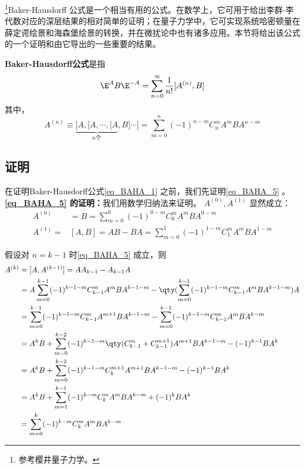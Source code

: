 \begin{issues}
\end{issues}


\footnote{参考樱井量子力学\cite{Sakurai}。}Baker-Hausdorff 公式是一个相当有用的公式。在数学上，它可用于给出李群-李代数对应的深层结果的相对简单的证明；在量子力学中，它可实现系统哈密顿量在薛定谔绘景和海森堡绘景的转换，并在微扰论中也有诸多应用。本节将给出该公式的一个证明和由它导出的一些重要的结果。

\textbf{Baker-Hausdorff公式}是指
\begin{equation}\label{eq_BAHA_1}
\E ^{A}B\E^{-A}=\sum_{n=0}^{\infty}\frac{1}{n!}[A^{(n)},B]
\end{equation}
其中，
\begin{equation}\label{eq_BAHA_5}
A^{(n)}\equiv\underbrace{[A,[A,\cdots,[A}_{n\text{个}},B]\cdots]
=\sum_{m=0}^{n}(-1)^{n-m}C_{n}^{m}A^mBA^{n-m}
\end{equation}

\subsection{证明}
在证明Baker-Hausdorff公式\autoref{eq_BAHA_1} 之前，我们先证明\autoref{eq_BAHA_5} 。\\

\textbf{\autoref{eq_BAHA_5} 的证明：}我们用数学归纳法来证明。
$A^{(0)},A^{(1)}$ 显然成立：
\begin{equation}
\begin{aligned}
A^{(0)}&=B=\sum_{m=0}^{0}(-1)^{0-m}C_{0}^{m}A^mBA^{0-m}\\
A^{(1)}=&[A,B]=AB-BA=\sum_{m=0}^{1}(-1)^{1-m}C_{1}^{m}A^mBA^{1-m}
\end{aligned}
\end{equation}

假设对 $n=k-1$ 时\autoref{eq_BAHA_5} 成立，则
\begin{equation}
\begin{aligned}
A^{(k)}&=[A,A^{(k-1)}]=AA_{k-1}-A_{k-1}A\\
&=A\sum_{m=0}^{k-1}(-1)^{k-1-m}C_{k-1}^{m}A^mBA^{k-1-m}-\qty(\sum_{m=0}^{k-1}(-1)^{k-1-m}C_{k-1}^{m}A^mBA^{k-1-m})A\\
&=\sum_{m=0}^{k-1}(-1)^{k-1-m}C_{k-1}^{m}A^{m+1}BA^{k-1-m}-\sum_{m=0}^{k-1}(-1)^{k-1-m}C_{k-1}^{m}A^mBA^{k-m}\\
&=A^{k}B+\sum_{m=0}^{k-2}(-1)^{k-1-m}\qty(C_{k-1}^{m}+C_{k-1}^{m+1})A^{m+1}BA^{k-1-m}-(-1)^{k-1}BA^k\\
&=A^{k}B+\sum_{m=0}^{k-2}(-1)^{k-1-m}C_{k}^{m+1}A^{m+1}BA^{k-1-m}-(-1)^{k-1}BA^k\\
&=A^{k}B+\sum_{m=1}^{k-1}(-1)^{k-m}C_{k}^{m}A^{m}BA^{k-m}+(-1)^{k}BA^k\\
&=\sum_{m=0}^{k}(-1)^{k-m}C_{k}^{m}A^{m}BA^{k-m}
\end{aligned}
\end{equation}

